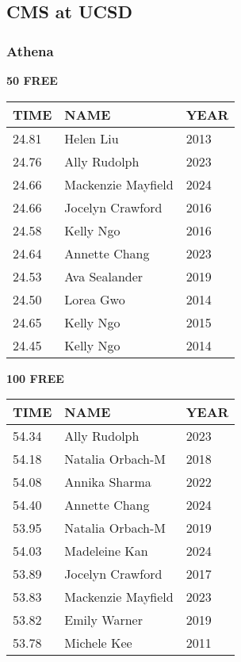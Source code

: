 
\newpage

\subsection{CMS at UCSD}
\subsubsection{Athena}

\begin{table}[H]
\centering
\begin{minipage}[t]{0.48\textwidth}
\centering
\textbf{50 FREE}\\[0.1cm]
\begin{tabular}{@{}p{1.8cm}p{2.8cm}p{1.2cm}@{}}
\hline
    \textbf{TIME} & \textbf{NAME} & \textbf{YEAR} \\
\hline
    24.81 & Helen Liu & 2013 \\
    24.76 & Ally Rudolph & 2023 \\
    24.66 & Mackenzie Mayfield & 2024 \\
    24.66 & Jocelyn Crawford & 2016 \\
    24.58 & Kelly Ngo & 2016 \\
    24.64 & Annette Chang & 2023 \\
    24.53 & Ava Sealander & 2019 \\
    24.50 & Lorea Gwo & 2014 \\
    24.65 & Kelly Ngo & 2015 \\
    24.45 & Kelly Ngo & 2014 \\
\hline
\end{tabular}
\end{minipage}\hfill
\begin{minipage}[t]{0.48\textwidth}
\centering
\textbf{100 FREE}\\[0.1cm]
\begin{tabular}{@{}p{1.8cm}p{2.8cm}p{1.2cm}@{}}
\hline
    \textbf{TIME} & \textbf{NAME} & \textbf{YEAR} \\
\hline
    54.34 & Ally Rudolph & 2023 \\
    54.18 & Natalia Orbach-M & 2018 \\
    54.08 & Annika Sharma & 2022 \\
    54.40 & Annette Chang & 2024 \\
    53.95 & Natalia Orbach-M & 2019 \\
    54.03 & Madeleine Kan & 2024 \\
    53.89 & Jocelyn Crawford & 2017 \\
    53.83 & Mackenzie Mayfield & 2023 \\
    53.82 & Emily Warner & 2019 \\
    53.78 & Michele Kee & 2011 \\
\hline
\end{tabular}
\end{minipage}
\end{table}

